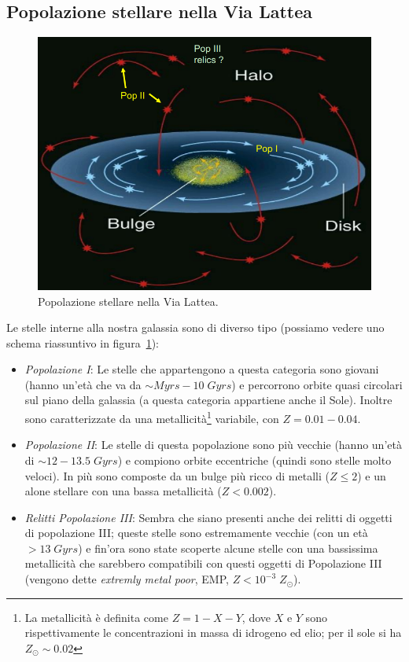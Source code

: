 \subsection{Popolazione stellare nella Via Lattea} \label{pop-stellare-via-lattea}
\begin{figure}
    \centering
    \includegraphics[width = 0.4 \textwidth]{immagini/popolazione-stellare-via-lattea.png}
    \caption{Popolazione stellare nella Via Lattea.}
    \label{fig:popolazione-stellare-via-lattea}
\end{figure}
Le stelle interne alla nostra galassia sono di diverso tipo (possiamo vedere uno schema riassuntivo in figura~\ref{fig:popolazione-stellare-via-lattea}):
\begin{itemize}
    \item \emph{Popolazione I}: Le stelle che appartengono a questa categoria sono giovani (hanno un'età che va da $\sim \si{Myrs} - 10 \;\si{Gyrs}$) e percorrono orbite quasi circolari sul piano della galassia (a questa categoria appartiene anche il Sole). Inoltre sono caratterizzate da una metallicità\footnote{La metallicità è definita come $Z = 1-X-Y$, dove $X$ e $Y$ sono rispettivamente le concentrazioni in massa di idrogeno ed elio; per il sole si ha $Z_{\odot}\sim 0.02$} variabile, con $Z=0.01-0.04$. 
    \item \emph{Popolazione II}: Le stelle di questa popolazione sono più vecchie (hanno un'età di $\sim 12 - 13.5 \; \si{Gyrs}$) e compiono orbite eccentriche (quindi sono stelle molto veloci). In più sono composte da un bulge più ricco di metalli ($Z \leq 2$) e un alone stellare con una bassa metallicità ($Z < 0.002$).
    \item \emph{Relitti Popolazione III}: Sembra che siano presenti anche dei relitti di oggetti di popolazione III; queste stelle sono estremamente vecchie (con un età $> 13 \; \si{Gyrs}$) e fin'ora sono state scoperte alcune stelle con una bassissima metallicità che sarebbero compatibili con questi oggetti di Popolazione III (vengono dette \emph{extremly metal poor}, EMP, $Z < 10^{-3} \;Z_{\odot}$).
\end{itemize}


